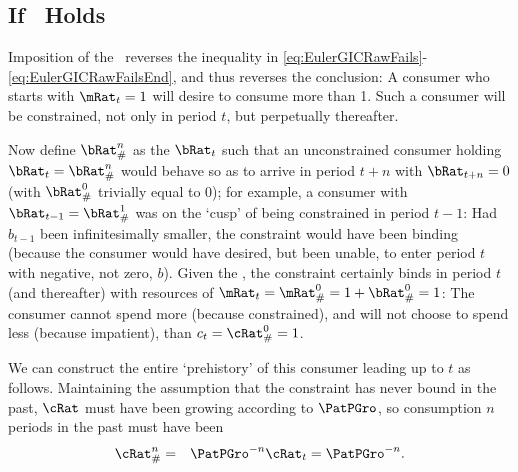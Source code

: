 \documentclass[./BufferStockTheory.tex]{subfiles}
\begin{document}
\subsection{If \GICRaw~Holds}

Imposition of the \GICRaw~reverses the inequality in
\eqref{eq:EulerGICRawFails}-\eqref{eq:EulerGICRawFailsEnd}, and thus
reverses the conclusion: A consumer who starts with $\mRat_{t}=1$ will
desire to consume more than 1.  Such a consumer will be constrained,
not only in period $t$, but perpetually thereafter.

Now define $\bRat_{\#}^{n}$ as the $\bRat_{t}$ such that
an unconstrained consumer holding $\bRat_{t}=\bRat_{\#}^{n}$ would behave so as to arrive in period $t+n$ with $\bRat_{t+n}=0$ (with $\bRat_{\#}^{0}$ trivially equal to 0); for example, a consumer with $\bRat_{t-1}=\bRat_{\#}^{1}$ was on the `cusp' of being constrained in period
$t-1$: Had $b_{t-1}$ been infinitesimally smaller, the constraint
would have been binding (because the consumer would have desired, but
been unable, to enter period $t$ with negative, not zero, $b$).  Given
the \GICRaw, the constraint certainly binds in period $t$ (and
thereafter) with resources of
$\mRat_{t}=\mRat_{\#}^{0}=1+\bRat_{\#}^{0}=1$: The consumer cannot
spend more (because constrained), and will not choose to spend less
(because impatient), than $c_{t}=\cRat_{\#}^{0}=1$.

We can construct the entire `prehistory' of this consumer leading up to $t$ as follows.
Maintaining the assumption that the constraint has never bound in the past,
$\cRat$ must have been growing according to $\PatPGro$, so consumption $n$ periods in the past must have been
\begin{eqnarray}
  \cRat_{\#}^{n} & = & \PatPGro^{-n} \cRat_{t} = \PatPGro^{-n}. \label{eq:cPreHist}
\end{eqnarray}
\end{document}
